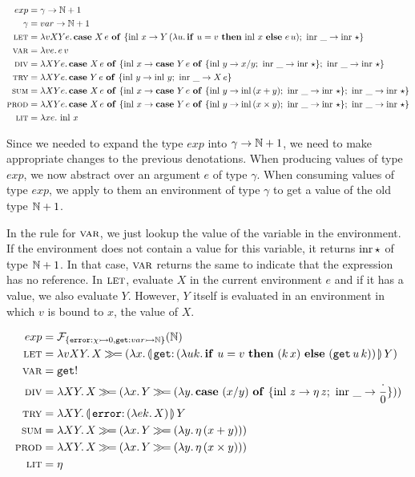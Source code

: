 \begin{align*}
  exp &= \gamma \to \mathbb{N} + 1 \\
  \gamma &= var \to \mathbb{N} + 1 \\
  \textsc{let} &= \lambda v X Y e.\, \text{\textbf{case} $X\,e$ \textbf{of} $\{ \operatorname{inl}\,x \to Y\,(\lambda u.\, \text{\textbf{if} $u = v$ \textbf{then} $\operatorname{inl}\,x$ \textbf{else} $e\,u$});\ \operatorname{inr}\,\_ \to \operatorname{inr}\,\star \}$} \\
  \textsc{var} &= \lambda v e.\, e\,v \\
  \textsc{div} &= \lambda X Y e.\, \text{\textbf{case} $X\,e$ \textbf{of} $\{ \operatorname{inl}\,x \to \text{\textbf{case} $Y\,e$ \textbf{of} $\{ \operatorname{inl}\,y \to x / y;\ \operatorname{inr}\,\_ \to \operatorname{inr}\,\star \}$};\ \operatorname{inr}\,\_ \to \operatorname{inr}\,\star \}$} \\ 
  \textsc{try} &= \lambda X Y e.\, \text{\textbf{case} $Y\,e$ \textbf{of} $\{ \operatorname{inl}\,y \to \operatorname{inl}\,y;\ \operatorname{inr}\,\_ \to X\,e \}$} \\ 
  \textsc{sum} &= \lambda X Y e.\, \text{\textbf{case} $X\,e$ \textbf{of} $\{ \operatorname{inl}\,x \to \text{\textbf{case} $Y\,e$ \textbf{of} $\{ \operatorname{inl}\,y \to \operatorname{inl}\,(x + y);\ \operatorname{inr}\,\_ \to \operatorname{inr}\,\star \}$};\ \operatorname{inr}\,\_ \to \operatorname{inr}\,\star \}$} \\ 
  \textsc{prod} &= \lambda X Y e.\, \text{\textbf{case} $X\,e$ \textbf{of} $\{ \operatorname{inl}\,x \to \text{\textbf{case} $Y\,e$ \textbf{of} $\{ \operatorname{inl}\,y \to \operatorname{inl}\,(x \times y);\ \operatorname{inr}\,\_ \to \operatorname{inr}\,\star \}$};\ \operatorname{inr}\,\_ \to \operatorname{inr}\,\star \}$} \\ 
  \textsc{lit} &= \lambda x e.\, \operatorname{inl}\,x
\end{align*}

Since we needed to expand the type $exp$ into $\gamma \to \mathbb{N} + 1$, we need
to make appropriate changes to the previous denotations. When producing
values of type $exp$, we now abstract over an argument $e$ of type
$\gamma$. When consuming values of type $exp$, we apply to them an
environment of type $\gamma$ to get a value of the old type $\mathbb{N} + 1$.

In the rule for $\textsc{var}$, we just lookup the value of the variable in the
environment. If the environment does not contain a value for this variable,
it returns $\operatorname{inr}{\star}$ of type $\mathbb{N} + 1$. In that case, $\textsc{var}$ returns
the same to indicate that the expression has no reference. In $\textsc{let}$,
evaluate $X$ in the current environment $e$ and if it has a value, we also
evaluate $Y$. However, $Y$ itself is evaluated in an environment in which
$v$ is bound to $x$, the value of $X$.


\begin{align*}
  exp &= \FF_{\{\typedop{error}{\chi}{0},\typedop{get}{var}{\NN}\}}(\NN) \\
  \lete &= \lam{v X Y}{X \hsbind
    (\lam{x}{\ap{\banana{\onto{\op{get}}{(\lam{u k}{\ifte{u = v}{(\ap{k}{x})}{(\app{\op{get}}{u}{k})}})}}}{Y}})} \\
  \vare &= \op{get}! \\
  \dive &= \lam{X Y}{X \hsbind (\lam{x}{Y \hsbind (\lam{y}{\case{(x / y)}{z}{\ap{\eta}{z}}{\_}{\dbze}})})} \\
  \trye &= \lam{X Y}{\ap{\banana{\onto{\op{error}}{(\lam{e k}{X})}}}{Y}} \\
  \sume &= \lam{X Y}{X \hsbind (\lam{x}{Y \hsbind (\lam{y}{\ap{\eta}{(x + y)}})})} \\
  \prode &= \lam{X Y}{X \hsbind (\lam{x}{Y \hsbind (\lam{y}{\ap{\eta}{(x \times y)}})})} \\
  \lite &= \eta
\end{align*}

